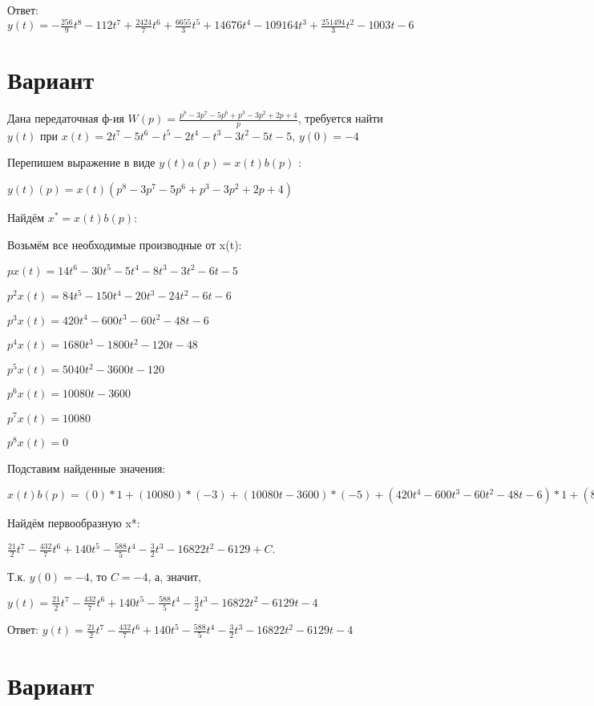 \documentclass{article}
\begin{document}
{{{{{Ответ: $y(t) = -\frac{256}{9}t^{8}-112t^{7}+\frac{2424}{7}t^{6}+\frac{6655}{3}t^{5}+14676t^{4}-109164t^{3}+\frac{251494}{3}t^{2}-1003t-6$

\section{Вариант}

Дана передаточная ф-ия $W(p)=\frac{p^{8}-3p^{7}-5p^{6}+p^{3}-3p^{2}+2p+4}{p}$, требуется найти $y(t)$ при $x(t)=2t^{7}-5t^{6}-t^{5}-2t^{4}-t^{3}-3t^{2}-5t-5$, $y(0)=-4$

Перепишем выражение в виде $y(t)a(p)=x(t)b(p)$ :

$y(t)(p)=x(t)(p^{8}-3p^{7}-5p^{6}+p^{3}-3p^{2}+2p+4)$

Найдём $x^*=x(t)b(p)$:

Возьмём все необходимые производные от x(t):

$px(t)=14t^{6}-30t^{5}-5t^{4}-8t^{3}-3t^{2}-6t-5$

$p^2x(t)=84t^{5}-150t^{4}-20t^{3}-24t^{2}-6t-6$

$p^3x(t)=420t^{4}-600t^{3}-60t^{2}-48t-6$

$p^4x(t)=1680t^{3}-1800t^{2}-120t-48$

$p^5x(t)=5040t^{2}-3600t-120$

$p^6x(t)=10080t-3600$

$p^7x(t)=10080$

$p^8x(t)=0$

Подставим найденные значения:

$x(t)b(p) = (0)*1+(10080)*(-3)+(10080t-3600)*(-5)+(420t^{4}-600t^{3}-60t^{2}-48t-6)*1+(84t^{5}-150t^{4}-20t^{3}-24t^{2}-6t-6)*(-3)+(14t^{6}-30t^{5}-5t^{4}-8t^{3}-3t^{2}-6t-5)*2+(14t^{6}-30t^{5}-5t^{4}-8t^{3}-3t^{2}-6t-5)*4=84t^{6}-432t^{5}+840t^{4}-588t^{3}-6t^{2}-50466t$





Найдём первообразную x*:

$\frac{21}{2}t^{7}-\frac{432}{7}t^{6}+140t^{5}-\frac{588}{5}t^{4}-\frac{3}{2}t^{3}-16822t^{2}-6129+C.$

Т.к. $y(0)=-4$, то $C=-4$, а, значит, 

$y(t)=\frac{21}{2}t^{7}-\frac{432}{7}t^{6}+140t^{5}-\frac{588}{5}t^{4}-\frac{3}{2}t^{3}-16822t^{2}-6129t-4$

Ответ: $y(t) = \frac{21}{2}t^{7}-\frac{432}{7}t^{6}+140t^{5}-\frac{588}{5}t^{4}-\frac{3}{2}t^{3}-16822t^{2}-6129t-4$

\section{Вариант}

}}}}}
\end{document}
